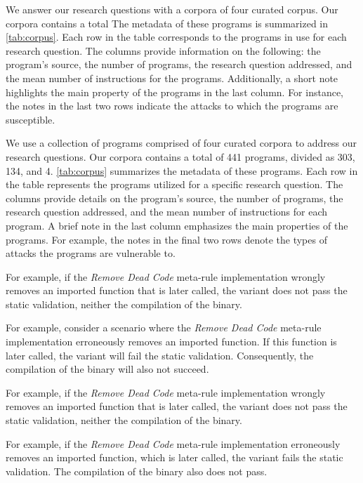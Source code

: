 We answer our research questions with a corpora of four curated corpus.
Our corpora contains a total 
The metadata of these programs is summarized in \autoref{tab:corpus}.
Each row in the table corresponds to the programs in use for each research question. 
The columns provide information on the following: the program's source, the number of programs, the research question addressed, and the mean number of instructions for the programs. 
Additionally, a short note highlights the main property of the programs in the last column. 
For instance, the notes in the last two rows indicate the attacks to which the programs are susceptible.

We use a collection of programs comprised of four curated corpora to address our research questions. 
Our corpora contains a total of 441 programs, divided as 303, 134, and 4. 
\autoref{tab:corpus} summarizes the metadata of these programs. 
Each row in the table represents the programs utilized for a specific research question. 
The columns provide details on the program's source, the number of programs, the research question addressed, and the mean number of instructions for each program. 
A brief note in the last column emphasizes the main properties of the programs. 
For example, the notes in the final two rows denote the types of attacks the programs are vulnerable to.


For example, if the \emph{Remove Dead Code} meta-rule implementation wrongly removes an imported function that is later called,  the variant does not pass the static validation, neither the compilation of the binary.

For example, consider a scenario where the \emph{Remove Dead Code} meta-rule implementation erroneously removes an imported function. If this function is later called, the variant will fail the static validation. Consequently, the compilation of the binary will also not succeed.

For example, if the \emph{Remove Dead Code} meta-rule implementation wrongly removes an imported function that is later called,  the variant does not pass the static validation, neither the compilation of the binary.

For example, if the \emph{Remove Dead Code} meta-rule implementation erroneously removes an imported function, which is later called, the variant fails the static validation. 
The compilation of the binary also does not pass.


